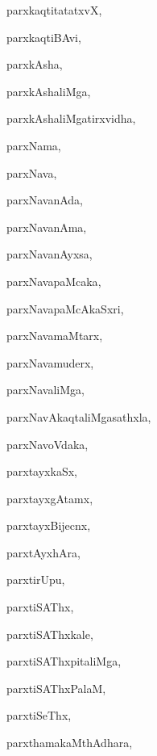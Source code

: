 \begin{multicols}{3}
{\noindent
{parxkaqtitatatxvX}, \pageref{parxkaqtitatatxvX}

\noindent
{parxkaqtiBAvi}, \pageref{parxkaqtiBAvi}

\noindent
{parxkAsha}, \pageref{parxkAsha}

\noindent
{parxkAshaliMga}, \pageref{parxkAshaliMga}

\noindent
{parxkAshaliMgatirxvidha}, \pageref{parxkAshaliMgatirxvidha}

\noindent
{parxNama}, \pageref{parxNama}

\noindent
{parxNava}, \pageref{parxNava}

\noindent
{parxNavanAda}, \pageref{parxNavanAda}

\noindent
{parxNavanAma}, \pageref{parxNavanAma}

\noindent
{parxNavanAyxsa}, \pageref{parxNavanAyxsa}

\noindent
{parxNavapaMcaka}, \pageref{parxNavapaMcaka}

\noindent
{parxNavapaMcAkaSxri}, \pageref{parxNavapaMcAkaSxri}

\noindent
{parxNavamaMtarx}, \pageref{parxNavamaMtarx}

\noindent
{parxNavamuderx}, \pageref{parxNavamuderx}

\noindent
{parxNavaliMga}, \pageref{parxNavaliMga}

\noindent
{parxNavAkaqtaliMgasathxla}, \pageref{parxNavAkaqtaliMgasathxla}

\noindent
{parxNavoVdaka}, \pageref{parxNavoVdaka}

\noindent
{parxtayxkaSx}, \pageref{parxtayxkaSx}

\noindent
{parxtayxgAtamx}, \pageref{parxtayxgAtamx}

\noindent
{parxtayxBijecnx}, \pageref{parxtayxBijecnx}

\noindent
{parxtAyxhAra}, \pageref{parxtAyxhAra}

\noindent
{parxtirUpu}, \pageref{parxtirUpu}

\noindent
{parxtiSAThx}, \pageref{parxtiSAThx}

\noindent
{parxtiSAThxkale}, \pageref{parxtiSAThxkale}

\noindent
{parxtiSAThxpitaliMga}, \pageref{parxtiSAThxpitaliMga}

\noindent
{parxtiSAThxPalaM}, \pageref{parxtiSAThxPalaM}

\noindent
{parxtiSeThx}, \pageref{parxtiSeThx}

\noindent
{parxthamakaMthAdhara}, \pageref{parxthamakaMthAdhara}

}
\end{multicols}
